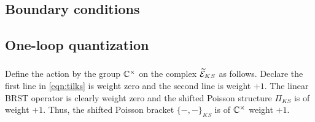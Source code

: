 \documentclass[11pt]{amsart}
\begin{document}

\subsection{Boundary conditions}


\subsection{One-loop quantization} 




\subsubsection{}

Define the action by the group $\mathbb C^\times$ on the complex $\widetilde{\mathcal E}_{KS}$ as follows.
Declare the first line in \eqref{eqn:tilks} is weight zero and the second line is weight $+1$. 
The linear BRST operator is clearly weight zero and the shifted Poisson structure $\Pi_{KS}$ is of weight $+1$. 
Thus, the shifted Poisson bracket $\{-,-\}_{KS}$ is of $\mathbb C^\times$ weight $+1$.
\end{document}
